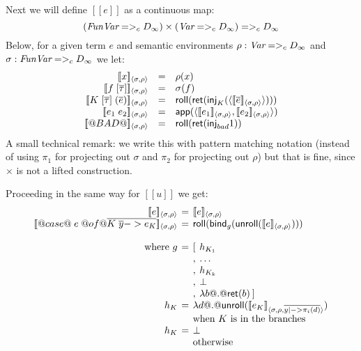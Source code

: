 \documentclass[preprint,nocopyrightspace,draft]{sigplanconf}
\begin{document}
Next we will define $[\![e]\!]$ as a continuous map: 
\[ 
    (\textit{FunVar} =>_c D_{\infty}) \times (\textit{Var} =>_c D_{\infty}) =>_c D_{\infty}
\] 
Below, for a given term $e$ and semantic environments $\rho : \textit{Var} =>_c D_{\infty}$ and 
$\sigma : \textit{FunVar} =>_c D_{\infty}$ we let: 
\[\begin{array}{rcll}
  \interp{x}{\sigma}{\rho} & = & \rho(x) \\ 
  \interp{f\;[\taus]}{\sigma}{\rho} & = & \sigma(f) \\
  \interp{K\;[\taus]\;(\ol{e})}{\sigma}{\rho} & = & \roll(\ret(\inj{K}(\langle\interp{\ol{e}}{\sigma}{\rho}\rangle))) \\ 
  \interp{e_1\;e_2}{\sigma}{\rho} & = & \dapp(\langle \interp{e_1}{\sigma}{\rho}, \interp{e_2}{\sigma}{\rho}\rangle) \\ 
  \interp{@BAD@}{\sigma}{\rho} & = & \roll(\ret(\inj{bad}1))
\end{array}\]
A small technical remark: we write this with pattern matching notation (instead of using $\pi_1$ for projecting 
out $\sigma$ and $\pi_2$ for projecting out $\rho$) but that is fine, since $\times$ is not a lifted construction. 

Proceeding in the same way for $[\![u]\!]$ we get:
\[\setlength{\arraycolsep}{2pt}
  \begin{array}{rcll}
  \interp{e}{\sigma}{\rho} & = & \multicolumn{2}{l}{\interp{e}{\sigma}{\rho}} \\ 
  \interp{@case@\;e\;@of@ \ol{ K\;\ys -> e_K}}{\sigma}{\rho} & = & \multicolumn{2}{l}{\roll(\bind_{g} (\unroll(\interp{e}{\sigma}{\rho})))} \\ \\ 
  \text{ where } g  & = & [ & h_{K_1} \\
                    &   & , & \ldots \\
                    &   & , & h_{K_k} \\
                    &   & , & \bot \\ 
                    &   & , & \dlambda b @.@ \ret(b) \hspace{2pt} ] \\ 
              h_{K} & =  & \multicolumn{2}{l}{\dlambda d @.@ \unroll(\interp{e_K}{\sigma}{\rho, \ol{y |-> \pi_i(d)}})} \\ 
                    &   & \multicolumn{2}{l}{\text{when } K \text{ is in the branches}} \\
              h_{K}  & = & \multicolumn{2}{l}{\bot } \\ 
                    &   & \multicolumn{2}{l}{\text{otherwise}}                  
\end{array}\]
\end{document}
